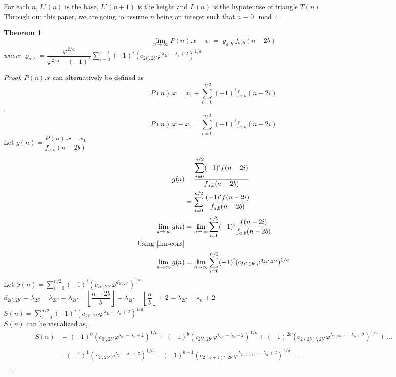 \documentclass[preprint,12pt]{elsarticle}
\newtheorem{theorem}{Theorem}[section]
\begin{document}
For each $n$, $L'(n)$ is the base, $L'(n + 1)$ is the height and $L(n)$ is the hypotenuse of triangle $T(n)$.\\
Through out this paper, we are going to assume $n$ being an integer such that $n \equiv 0\mod4$
\begin{theorem}
	\label{lim-P}
	$$\lim_{n \to \infty} P(n).x - x_1 = \varrho_{a,b}f_{a,b}(n - 2b)$$
	where $\varrho_{a,b} = \dfrac{\varphi^{2/a}}{\varphi^{2/a} - (-1)^b}\displaystyle\sum_{i = 0}^{b - 1}(-1)^i (c_{2i', 2b'}\varphi^{\lambda_{2i'}-\lambda_{n}+2})^{1/a}$
\end{theorem}
\begin{proof}
	$P(n).x$ can alternatively be defined as $$P(n).x = x_1 + \sum_{i = 0}^{n / 2}(-1)^i f_{a,b}(n-2i)$$.
	$$P(n).x - x_1 = \sum_{i = 0}^{n / 2}(-1)^i f_{a,b}(n-2i)$$
	Let $g(n) = \dfrac{P(n).x - x_1}{f_{a,b}(n - 2b)}$
	\begin{align*}
	g(n) &= \dfrac{\displaystyle\sum_{i = 0}^{n / 2}(-1)^i f(n-2i)}{f_{a,b}(n - 2b)}\\
	&= \sum_{i = 0}^{n / 2}\dfrac{(-1)^i f(n-2i)}{f_{a,b}(n - 2b)}\\
	\lim_{n \to \infty}g(n) &= \lim_{n \to \infty}\sum_{i = 0}^{n / 2}(-1)^i \dfrac{f(n-2i)}{f_{a,b}(n - 2b)}\\
	\text{Using \ref{lim-cons}}\\
	\lim_{n \to \infty}g(n) &= \lim_{n \to \infty}\sum_{i = 0}^{n / 2}(-1)^i (c_{2i',2b'}\varphi^{d_{2i',2b'}})^{1/a}
	\end{align*}
	Let $S(n) = \displaystyle\sum_{i = 0}^{n/2}(-1)^i (c_{2i',2b'}\varphi^{d_{2i',2b'}})^{1/a}$\\
	$d_{2i',2b'} = \lambda_{2i'}-\lambda_{2b'}=\lambda_{2i'}-\left\lfloor\dfrac{n-2b}{b}\right\rfloor = \lambda_{2i'}- \left\lfloor\dfrac{n}{b}\right\rfloor + 2 = \lambda_{2i'}-\lambda_{n}+2$\\
	$S(n) = \displaystyle\sum_{i = 0}^{n/2}(-1)^i (c_{2i',2b'}\varphi^{\lambda_{2i'}-\lambda_{n}+2})^{1/a}$\\
	$S(n)$ can be visualized as,\\
	\begin{align*}
		S(n) &= (-1)^0(c_{0',2b'}\varphi^{\lambda_{0'}-\lambda_{n}+2})^{1/a}+(-1)^{b}(c_{2b',2b'}\varphi^{\lambda_{2b'}-\lambda_{n}+2})^{1/a}+(-1)^{2b}(c_{2(2b)',2b'}\varphi^{\lambda_{2(2b)'}-\lambda_{n}+2})^{1/a}+\ldots\\\\
		&+(-1)^1(c_{2',2b'}\varphi^{\lambda_{2'}-\lambda_{n}+2})^{1/a}+(-1)^{b+1}(c_{2(b+1)',2b'}\varphi^{\lambda_{2(b+1)'}-\lambda_{n}+2})^{1/a}+\ldots\\

\end{align*}
\end{proof}
\end{document}
